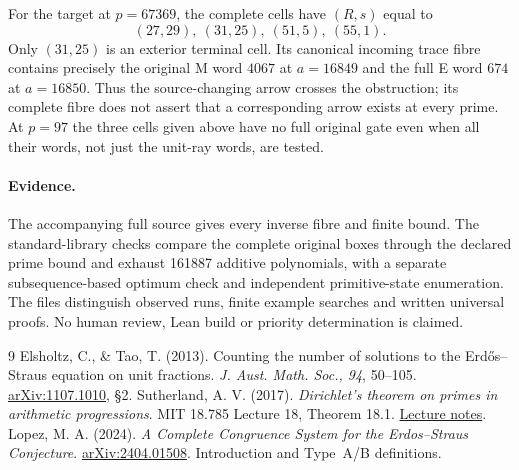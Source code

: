 \documentclass[10pt,reqno]{amsart}
\begin{document}
For the target at $p=67369$, the complete cells have $(R,s)$ equal to
\[
 (27,29),\ (31,25),\ (51,5),\ (55,1).
\]
Only $(31,25)$ is an exterior terminal cell. Its canonical incoming trace fibre
contains precisely the original M word $4067$ at $a=16849$ and the full E word
$674$ at $a=16850$. Thus the source-changing arrow crosses the obstruction;
its complete fibre does not assert that a corresponding arrow exists at every
prime. At $p=97$ the three cells given above have no full original gate even
when all their words, not just the unit-ray words, are tested.

\paragraph{Evidence.}
The accompanying full source gives every inverse fibre and finite bound.
The standard-library checks compare the complete original boxes through the
declared prime bound and exhaust 161887 additive polynomials, with a separate
subsequence-based optimum check and independent primitive-state enumeration.
The files distinguish observed runs, finite example searches and written
universal proofs. No human review, Lean build or priority determination is claimed.

\begin{thebibliography}{9}
 Elsholtz, C., \& Tao, T. (2013). Counting the number of solutions to
the Erd\H{o}s--Straus equation on unit fractions. \emph{J. Aust. Math. Soc., 94},
50--105. \href{https://arxiv.org/abs/1107.1010}{arXiv:1107.1010}, \S2.
 Sutherland, A. V. (2017). \emph{Dirichlet's theorem on primes in
arithmetic progressions}. MIT 18.785 Lecture 18, Theorem 18.1.
\href{https://math.mit.edu/classes/18.785/2017fa/LectureNotes18.pdf}{Lecture notes}.
 Lopez, M. A. (2024). \emph{A Complete Congruence System for the
Erdos--Straus Conjecture}. \href{https://arxiv.org/abs/2404.01508}{arXiv:2404.01508}.
Introduction and Type~A/B definitions.
\end{thebibliography}
\end{document}
